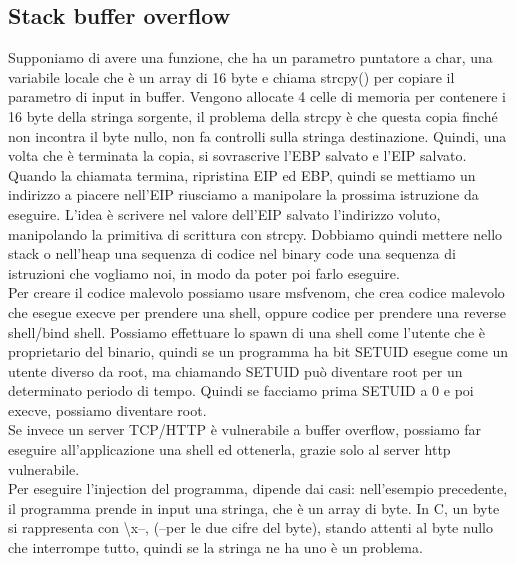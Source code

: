 \documentclass{article}
\begin{document}
\subsection{Stack buffer overflow}
Supponiamo di avere una funzione, che ha un parametro puntatore a char, una variabile locale che è un array di 16 byte e chiama strcpy() per copiare il parametro di input in buffer. Vengono allocate 4 celle di memoria per contenere i 16 byte della stringa sorgente, il problema della strcpy è che questa copia finché non incontra il byte nullo, non fa controlli sulla stringa destinazione. Quindi, una volta che è terminata la copia, si sovrascrive l'EBP salvato e l'EIP salvato. Quando la chiamata termina, ripristina EIP ed EBP, quindi se mettiamo un indirizzo a piacere nell'EIP riusciamo a manipolare la prossima istruzione da eseguire. L'idea è scrivere nel valore dell'EIP salvato l'indirizzo voluto, manipolando la primitiva di scrittura con strcpy. Dobbiamo quindi mettere nello stack o nell'heap una sequenza di codice nel binary code una sequenza di istruzioni che vogliamo noi, in modo da poter poi farlo eseguire.\\ Per creare il codice malevolo possiamo usare msfvenom, che crea codice malevolo che esegue execve per prendere una shell, oppure codice per prendere una reverse shell/bind shell. Possiamo effettuare lo spawn di una shell come l'utente che è proprietario del binario, quindi se un programma ha bit SETUID esegue come un utente diverso da root, ma chiamando SETUID può diventare root per un determinato periodo di tempo. Quindi se facciamo prima SETUID a 0 e poi execve, possiamo diventare root.\\ Se invece un server TCP/HTTP è vulnerabile a buffer overflow, possiamo far eseguire all'applicazione una shell ed ottenerla, grazie solo al server http vulnerabile. \\ Per eseguire l'injection del programma, dipende dai casi: nell'esempio precedente, il programma prende in input una stringa, che è un array di byte. In C, un byte si rappresenta con \textbackslash x--, (--per le due cifre del byte), stando attenti al byte nullo che interrompe tutto, quindi se la stringa ne ha uno è un problema.
\end{document}
